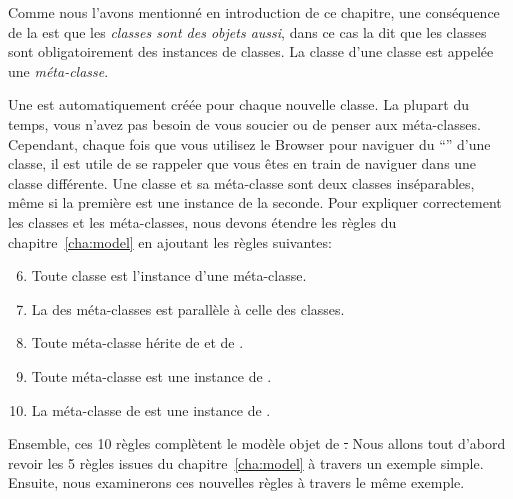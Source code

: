 \documentclass[a4paper,10pt,twoside]{book}
\begin{document}
Comme nous l'avons mentionné en introduction de ce chapitre, une conséquence de la  est que les \emph{classes sont des objets aussi}, dans ce cas la  dit que les classes sont obligatoirement des instances de classes.
La classe d'une classe est appelée une \emph{méta-classe}.

Une  est automatiquement créée pour chaque nouvelle classe.
La plupart du temps, vous n'avez pas besoin de vous soucier ou de penser aux méta-classes.
Cependant, chaque fois que vous utilisez le Browser pour naviguer du  ``'' d'une classe, il est utile de se rappeler que vous êtes en train de naviguer dans une classe différente.
Une classe et sa méta-classe sont deux classes inséparables, même si la première est une instance de la seconde.
Pour expliquer correctement les classes et les méta-classes, nous devons étendre les règles du chapitre~\ref{cha:model} en ajoutant les règles suivantes:

\begin{enumerate}[label={\textbf{Règle \arabic{*}}.}, ref={Règle \arabic{*}}, leftmargin=*, widest=10]
\setcounter{enumi}{5}
\item{} 
	Toute classe est l'instance d'une méta-classe.

\item{} 
	La  des méta-classes est parallèle à celle des classes.

\item{} 
	Toute méta-classe hérite de  et de .

\item{} 
	Toute méta-classe est une instance de .

\item{} 
	La méta-classe de  est une instance de .

\end{enumerate}

Ensemble, ces 10 règles complètent le modèle objet de \st.
Nous allons tout d'abord revoir les 5 règles issues du chapitre~\ref{cha:model} à travers un exemple simple.
Ensuite, nous examinerons ces nouvelles règles à travers le même exemple.

\end{document}
